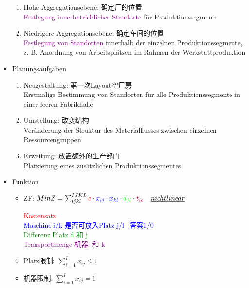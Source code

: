 \documentclass[12pt, letterpaper]{article}
\begin{document}
\begin{CJK*}{UTF8}{gbsn}
\begin{itemize}
\begin{enumerate}
\item Hohe Aggregationsebene: 确定厂的位置\\
\textcolor{purple}{Festlegung innerbetrieblicher Standorte} für Produktionssegmente
\item Niedrigere Aggregationsebene: 确定车间的位置\\
\textcolor{purple}{Festlegung von Standorten} innerhalb der einzelnen Produktionssegmente, z. B. Anordnung von Arbeitsplätzen im
Rahmen der Werkstattproduktion
\end{enumerate}


\item Planungsaufgaben

\begin{enumerate}
\item Neugestaltung: 第一次Layout空厂房\\
Erstmalige Bestimmung von Standorten für alle Produktionssegmente in einer leeren Fabrikhalle

\item Umstellung: 改变结构\\
Veränderung der Struktur des Materialflusses zwischen einzelnen Ressourcengruppen

\item Erweitung: 放置额外的生产部门\\
Platzierung eines zusätzlichen Produktionssegmentes
\end{enumerate}

\newpage

\item Funktion
\begin{itemize}

\item  ZF: $Min Z =   \sum_{ijkl}^{IJKL} 
\textcolor{red}{c} 
 \cdot \textcolor{blue}{x_{ij}}
 \cdot \textcolor{blue}{x_{kl}}
  \cdot \textcolor{green}{d_{jl}}
   \cdot \textcolor{purple}{t_{ik}}\ \  \   \underline{ nicht linear }$ 
   

\textcolor{red}{Kostensatz}\\
\textcolor{blue}{Maschine i/k 是否可放入Platz j/l \ 答案1/0}\\
\textcolor{green}{Differenz Platz d 和 j}\\
\textcolor{purple}{Transportmenge 机器i 和 k}
   
 \item Platz限制: $\sum_{i=1}^{I} x_{ij} \leq 1$
 \item 机器限制: $\sum_{i=1}^{I} x_{ij} = 1$\\[5mm]
 

\end{itemize}
\end{itemize}
\end{CJK*}
\end{document}
